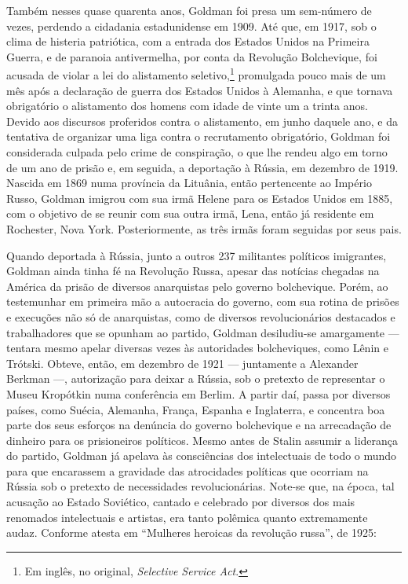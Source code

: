 Também nesses quase quarenta anos, Goldman foi presa um sem-número de
vezes, perdendo a cidadania estadunidense em 1909. Até que, em 1917, sob
o clima de histeria patriótica, com a entrada dos Estados Unidos na
Primeira Guerra, e de paranoia antivermelha, por conta da Revolução
Bolchevique, foi acusada de violar a lei do alistamento seletivo,\footnote{Em inglês, no original, \textit{Selective Service Act}.} promulgada pouco mais de um mês após
a declaração de guerra dos Estados Unidos à Alemanha, e que tornava
obrigatório o alistamento dos homens com idade de vinte um a trinta
anos. Devido aos discursos proferidos contra o alistamento, em junho
daquele ano, e da tentativa de organizar uma liga contra o recrutamento
obrigatório, Goldman foi considerada culpada pelo crime de conspiração,
o que lhe rendeu algo em torno de um ano de prisão e, em seguida, a
deportação à Rússia, em dezembro de 1919. Nascida em 1869 numa província da
Lituânia, então pertencente ao Império Russo, Goldman imigrou
com sua irmã Helene para os Estados Unidos em 1885, com o objetivo de
se reunir com sua outra irmã, Lena, então já residente em Rochester,
Nova York. Posteriormente, as três irmãs foram seguidas por seus pais.

Quando deportada à Rússia, junto a outros 237
militantes políticos imigrantes, Goldman ainda tinha fé na Revolução
Russa, apesar das notícias chegadas na América da prisão de diversos
anarquistas pelo governo bolchevique. Porém, ao testemunhar em
primeira mão a autocracia do governo, com sua rotina de prisões e
execuções não só de anarquistas, como de diversos revolucionários
destacados e trabalhadores que se opunham ao partido,
Goldman desiludiu-se amargamente --- tentara mesmo apelar diversas vezes às autoridades bolcheviques, como Lênin e Trótski.
Obteve, então, em dezembro de 1921 --- juntamente a Alexander
Berkman ---, autorização para deixar a Rússia, sob o pretexto de
representar o Museu Kropótkin numa conferência em Berlim. A partir daí,
passa por diversos países, como Suécia, Alemanha, França, Espanha e
Inglaterra, e concentra boa parte dos seus esforços na denúncia do
governo bolchevique e na arrecadação de dinheiro para os prisioneiros
políticos. Mesmo antes de Stalin assumir a liderança do partido, Goldman
já apelava às consciências dos intelectuais de todo o mundo para que
encarassem a gravidade das atrocidades políticas que ocorriam
na Rússia sob o pretexto de necessidades revolucionárias. Note-se
que, na época, tal acusação ao Estado Soviético, cantado e
celebrado por diversos dos mais renomados intelectuais e artistas, era
tanto polêmica quanto extremamente audaz. Conforme atesta
em ``Mulheres heroicas da revolução russa'', de 1925:

